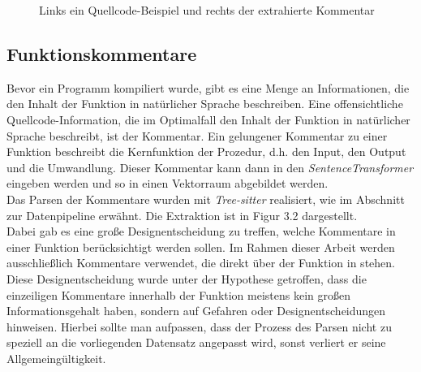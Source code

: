 \documentclass[12pt,letterpaper,ngerman]{article}
\begin{document}
%
\pagebreak

\begin{figure}
  \begin{center}
    \begin{minipage}[c]{6cm}
        \centering
        \inputminted[fontsize=\scriptsize]{c}{comments.c}
    \end{minipage}
    \hspace{0.1cm}
    \begin{minipage}[c]{6cm}
        \centering
        \inputminted[fontsize=\scriptsize]{json}{comments.json}
    \end{minipage}
  \end{center}
  \caption{Links ein Quellcode-Beispiel und rechts der extrahierte Kommentar}
\end{figure}

\subsection{Funktionskommentare}
Bevor ein Programm kompiliert wurde, gibt es eine Menge an
Informationen, die den Inhalt der Funktion in natürlicher Sprache 
beschreiben. Eine offensichtliche Quellcode-Information, die im
Optimalfall den Inhalt der Funktion in natürlicher Sprache 
beschreibt, ist der Kommentar. Ein gelungener Kommentar zu einer
Funktion beschreibt die Kernfunktion der Prozedur, d.h. den Input,
den Output und die Umwandlung. Dieser Kommentar kann dann in den 
\textit{SentenceTransformer} eingeben werden und so in einen
Vektorraum abgebildet werden.\\
Das Parsen der Kommentare wurden mit \textit{Tree-sitter} realisiert,
wie im Abschnitt zur Datenpipeline erwähnt. Die Extraktion ist in 
Figur 3.2 dargestellt.\\
Dabei gab es eine große
Designentscheidung zu treffen, welche Kommentare in einer Funktion
berücksichtigt werden sollen.
Im Rahmen dieser Arbeit werden ausschließlich Kommentare verwendet,
die direkt  über der Funktion in stehen. Diese Designentscheidung
wurde unter der Hypothese getroffen, dass die einzeiligen
Kommentare innerhalb der Funktion meistens kein großen
Informationsgehalt haben, sondern auf
Gefahren oder Designentscheidungen hinweisen.
Hierbei sollte man aufpassen, dass der Prozess des Parsen nicht zu
speziell an die vorliegenden Datensatz angepasst wird, sonst 
verliert er seine Allgemeingültigkeit. 
\end{document}
